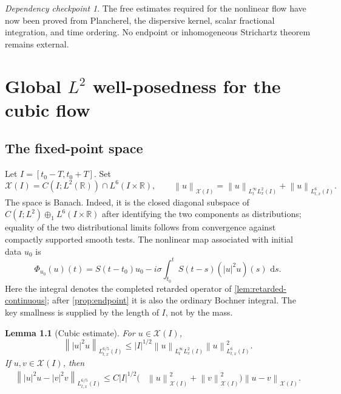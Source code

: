 \documentclass[11pt,oneside]{book}
\newtheorem{lemma}[theorem]{Lemma}
\theoremstyle{definition}
\theoremstyle{remark}
\newtheorem{checkpoint}[theorem]{Dependency checkpoint}
\newcommand{\R}{\mathbb R}
\newcommand{\1}{\mathbf 1}
\newcommand{\dd}{\,\mathrm d}
\newcommand{\norm}[1]{\left\lVert #1\right\rVert}
\begin{document}
\begin{checkpoint}
The free estimates required for the nonlinear flow have now been proved from
Plancherel, the dispersive kernel, scalar fractional integration, and time
ordering.  No endpoint or inhomogeneous Strichartz theorem remains external.
\end{checkpoint}

\chapter{Global \texorpdfstring{$L^2$}{L2} well-posedness for the cubic flow}\label{chap:wellposed}

\section{The fixed-point space}
Let $I=[t_0-T,t_0+T]$.  Set
\[
  \mathcal X(I)=C(I;L^2(\R))\cap L^6(I\times\R),
  \qquad
  \norm u_{\mathcal X(I)}
  =\norm u_{L^\infty_tL^2_x(I)}+\norm u_{L^6_{t,x}(I)}.
\]
The space is Banach.  Indeed, it is the closed diagonal subspace of
$C(I;L^2)\oplus_1L^6(I\times\R)$ after identifying the two components as
distributions; equality of the two distributional limits follows from
convergence against compactly supported smooth tests.
The nonlinear map associated with initial data $u_0$ is
\begin{equation}
 \Phi_{u_0}(u)(t)
 =S(t-t_0)u_0-i\sigma\int_{t_0}^tS(t-s)(|u|^2u)(s)\,\dd s.  \label{eq:Phi}
\end{equation}
Here the integral denotes the completed retarded operator of
\cref{lem:retarded-continuous}; after \cref{prop:endpoint} it is also the
ordinary Bochner integral.  The key smallness is supplied by the length of
$I$, not by the mass.

\begin{lemma}[Cubic estimate]\label{lem:cubic-65}
For $u\in\mathcal X(I)$,
\begin{equation}
 \norm{|u|^2u}_{L^{6/5}_{t,x}(I)}
 \le |I|^{1/2}\norm u_{L^\infty_tL^2_x(I)}
                    \norm u_{L^6_{t,x}(I)}^2.       \label{eq:cubic65}
\end{equation}
If $u,v\in\mathcal X(I)$, then
\begin{align}
 \norm{|u|^2u-|v|^2v}_{L^{6/5}_{t,x}(I)}
 \le C|I|^{1/2}
  (&\norm u_{\mathcal X(I)}^2+\norm v_{\mathcal X(I)}^2)
  \norm{u-v}_{\mathcal X(I)}.                      \label{eq:cubic-lip}
\end{align}
\end{lemma}
\end{document}

